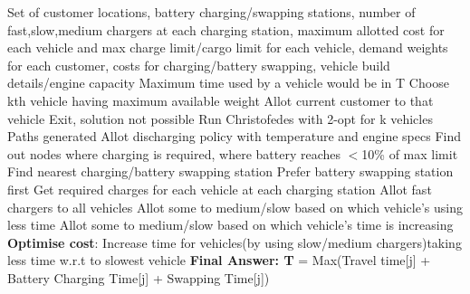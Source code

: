 \documentclass[conference]{IEEEtran}
\begin{document}
\begin{algorithm}[!h]
\begin{algorithmic}[1]
\renewcommand{\algorithmicrequire}
    {\textbf{Input:}}
    \REQUIRE Set of customer locations, battery charging/swapping stations, number of fast,slow,medium chargers at each charging station, maximum allotted cost for each vehicle and max charge limit/cargo limit for each vehicle, demand weights for each customer, costs for charging/battery swapping, vehicle build details/engine capacity
\renewcommand{\algorithmicensure}{\textbf{Output:}}    
\ENSURE Maximum time used by a vehicle would be in T
 \label{OFL2} 
\State Choose kth vehicle having maximum available weight
\State Allot current customer to that vehicle
\ENDFOR
{}
\State Exit, solution not possible
\ELSE
    \State Run Christofedes with 2-opt for k vehicles
    \State Paths generated
    \State Allot discharging policy with temperature and engine specs
    \State Find out nodes where charging is required, where battery reaches \(<\)10\% of max limit
    \State Find nearest charging/battery swapping station
    \State Prefer battery swapping station first
    \State Get required charges for each vehicle at each charging station
    \State Allot fast chargers to all vehicles
        \State Allot some to medium/slow based on which vehicle's using less time
    \ENDIF
      \State Allot some to medium/slow based on which vehicle's time is increasing
    \ENDIF
    \State \textbf{Optimise cost}: Increase time for vehicles(by using slow/medium chargers)taking less time w.r.t to slowest vehicle
     \label{OFL2} 
    \State \textbf{Final Answer: T} = Max(Travel time[j] + Battery Charging Time[j] + Swapping Time[j])
\ENDFOR
\ENDIF 
\end{algorithmic}
\caption{}
\label{offAlgo2}
\end{algorithm}
\end{document}
